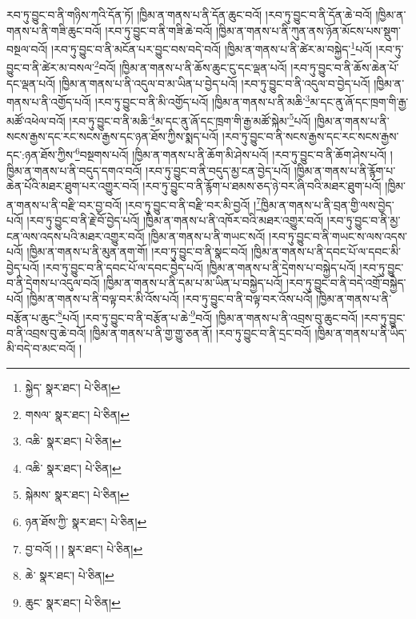 རབ་ཏུ་བྱུང་བ་ནི་གཉིས་ཀའི་དོན་ཏོ། །ཁྱིམ་ན་གནས་པ་ནི་དོན་ཆུང་བའོ། །རབ་ཏུ་བྱུང་བ་ནི་དོན་ཆེ་བའོ། །ཁྱིམ་ན་གནས་པ་ནི་གཟི་ཆུང་བའོ། །རབ་ཏུ་བྱུང་བ་ནི་གཟི་ཆེ་བའོ། །ཁྱིམ་ན་གནས་པ་ནི་ཀུན་ནས་ཉོན་མོངས་པས་སྡུག་བསྔལ་བའོ། །རབ་ཏུ་བྱུང་བ་ནི་མངོན་པར་བྱུང་བས་བདེ་བའོ། །ཁྱིམ་ན་གནས་པ་ནི་ཚེར་མ་བསྐྱེད་\footnote{སྐྱེད་  སྣར་ཐང་།  པེ་ཅིན། }པའོ། །རབ་ཏུ་བྱུང་བ་ནི་ཚེར་མ་བསལ་\footnote{གསལ་  སྣར་ཐང་།  པེ་ཅིན། }བའོ། །ཁྱིམ་ན་གནས་པ་ནི་ཆོས་ཆུང་ངུ་དང་ལྡན་པའོ། །རབ་ཏུ་བྱུང་བ་ནི་ཆོས་ཆེན་པོ་དང་ལྡན་པའོ། །ཁྱིམ་ན་གནས་པ་ནི་འདུལ་བ་མ་ཡིན་པ་བྱེད་པའོ། །རབ་ཏུ་བྱུང་བ་ནི་འདུལ་བ་བྱེད་པའོ། །ཁྱིམ་ན་གནས་པ་ནི་འགྱོད་པའོ། །རབ་ཏུ་བྱུང་བ་ནི་མི་འགྱོད་པའོ། །ཁྱིམ་ན་གནས་པ་ནི་མཆི་\footnote{འཆི་  སྣར་ཐང་།  པེ་ཅིན། }མ་དང་ནུ་ཞོ་དང་ཁྲག་གི་རྒྱ་མཚོ་འཕེལ་བའོ། །རབ་ཏུ་བྱུང་བ་ནི་མཆི་\footnote{འཆི་  སྣར་ཐང་།  པེ་ཅིན། }མ་དང་ནུ་ཞོ་དང་ཁྲག་གི་རྒྱ་མཚོ་སྐེམ་\footnote{སྐེམས་  སྣར་ཐང་།  པེ་ཅིན། }པའོ། །ཁྱིམ་ན་གནས་པ་ནི་སངས་རྒྱས་དང་རང་སངས་རྒྱས་དང་ཉན་ཐོས་ཀྱིས་སྨད་པའོ། །རབ་ཏུ་བྱུང་བ་ནི་སངས་རྒྱས་དང་རང་སངས་རྒྱས་དང་:ཉན་ཐོས་ཀྱིས་\footnote{ཉན་ཐོས་ཀྱི་  སྣར་ཐང་།  པེ་ཅིན། }བསྔགས་པའོ། །ཁྱིམ་ན་གནས་པ་ནི་ཆོག་མི་ཤེས་པའོ། །རབ་ཏུ་བྱུང་བ་ནི་ཆོག་ཤེས་པའོ། །ཁྱིམ་ན་གནས་པ་ནི་བདུད་དགའ་བའོ། །རབ་ཏུ་བྱུང་བ་ནི་བདུད་མྱ་ངན་བྱེད་པའོ། །ཁྱིམ་ན་གནས་པ་ནི་རྙོག་པ་ཆེན་པོའི་མཐར་ཐུག་པར་འགྱུར་བའོ། །རབ་ཏུ་བྱུང་བ་ནི་རྙོག་པ་ཐམས་ཅད་ཉེ་བར་ཞི་བའི་མཐར་ཐུག་པའོ། །ཁྱིམ་ན་གནས་པ་ནི་བརྫི་བར་བྱ་བའོ། །རབ་ཏུ་བྱུང་བ་ནི་བརྫི་བར་མི་བྱའོ། །\footnote{བྱ་བའོ། ། །  སྣར་ཐང་།  པེ་ཅིན། }ཁྱིམ་ན་གནས་པ་ནི་བྲན་གྱི་ལས་བྱེད་པའོ། །རབ་ཏུ་བྱུང་བ་ནི་རྗེ་བོ་བྱེད་པའོ། །ཁྱིམ་ན་གནས་པ་ནི་འཁོར་བའི་མཐར་འགྱུར་བའོ། །རབ་ཏུ་བྱུང་བ་ནི་མྱ་ངན་ལས་འདས་པའི་མཐར་འགྱུར་བའོ། །ཁྱིམ་ན་གནས་པ་ནི་གཡང་སའོ། །རབ་ཏུ་བྱུང་བ་ནི་གཡང་ས་ལས་འདས་པའོ། །ཁྱིམ་ན་གནས་པ་ནི་མུན་ནག་གོ། །རབ་ཏུ་བྱུང་བ་ནི་སྣང་བའོ། །ཁྱིམ་ན་གནས་པ་ནི་དབང་པོ་ལ་དབང་མི་བྱེད་པའོ། །རབ་ཏུ་བྱུང་བ་ནི་དབང་པོ་ལ་དབང་བྱེད་པའོ། །ཁྱིམ་ན་གནས་པ་ནི་དྲེགས་པ་བསྐྱེད་པའོ། །རབ་ཏུ་བྱུང་བ་ནི་དྲེགས་པ་འདུལ་བའོ། །ཁྱིམ་ན་གནས་པ་ནི་དམ་པ་མ་ཡིན་པ་བསྐྱེད་པའོ། །རབ་ཏུ་བྱུང་བ་ནི་བདེ་འགྲོ་བསྐྱེད་པའོ། །ཁྱིམ་ན་གནས་པ་ནི་བལྟ་བར་མི་འོས་པའོ། །རབ་ཏུ་བྱུང་བ་ནི་བལྟ་བར་འོས་པའོ། །ཁྱིམ་ན་གནས་པ་ནི་བརྩོན་པ་ཆུང་\footnote{ཆེ་  སྣར་ཐང་།  པེ་ཅིན། }པའོ། །རབ་ཏུ་བྱུང་བ་ནི་བརྩོན་པ་ཆེ་\footnote{ཆུང་  སྣར་ཐང་།  པེ་ཅིན། }བའོ། །ཁྱིམ་ན་གནས་པ་ནི་འབྲས་བུ་ཆུང་བའོ། །རབ་ཏུ་བྱུང་བ་ནི་འབྲས་བུ་ཆེ་བའོ། །ཁྱིམ་ན་གནས་པ་ནི་གྱ་གྱུ་ཅན་ནོ། །རབ་ཏུ་བྱུང་བ་ནི་དྲང་བའོ། །ཁྱིམ་ན་གནས་པ་ནི་ཡིད་མི་བདེ་བ་མང་བའོ། །
